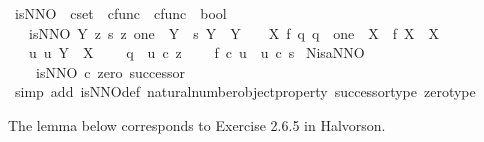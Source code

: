 \begin{isabellebody}
\endisatagproof
{\isafoldproof}%
%
\isadelimproof
\isanewline
%
\endisadelimproof
\isanewline
{}\isamarkupfalse%
\ is{\isacharunderscore}{\kern0pt}NNO\ {\isacharcolon}{\kern0pt}{\isacharcolon}{\kern0pt}\ {\isachardoublequoteopen}cset\ {\isasymRightarrow}\ cfunc\ {\isasymRightarrow}\ cfunc\ {\isasymRightarrow}\ bool{\isachardoublequoteclose}\ \ \isanewline
\ \ \ {\isachardoublequoteopen}is{\isacharunderscore}{\kern0pt}NNO\ Y\ z\ s\ {\isasymlongleftrightarrow}{\isacharparenleft}{\kern0pt}z{\isacharcolon}{\kern0pt}\ one\ {\isasymrightarrow}\ Y\ {\isasymand}\ s{\isacharcolon}{\kern0pt}\ Y\ {\isasymrightarrow}\ Y\ \ {\isasymand}\ {\isacharparenleft}{\kern0pt}{\isasymforall}\ X\ f\ q{\isachardot}{\kern0pt}\ {\isacharparenleft}{\kern0pt}{\isacharparenleft}{\kern0pt}q\ {\isacharcolon}{\kern0pt}\ one\ {\isasymrightarrow}\ X{\isacharparenright}{\kern0pt}\ {\isasymand}\ {\isacharparenleft}{\kern0pt}f{\isacharcolon}{\kern0pt}\ X\ {\isasymrightarrow}\ X{\isacharparenright}{\kern0pt}{\isacharparenright}{\kern0pt}{\isasymlongrightarrow}\isanewline
\ \ \ {\isacharparenleft}{\kern0pt}{\isasymexists}{\isacharbang}{\kern0pt}u{\isachardot}{\kern0pt}\ u{\isacharcolon}{\kern0pt}\ Y\ {\isasymrightarrow}\ X\ {\isasymand}\isanewline
\ \ \ q\ {\isacharequal}{\kern0pt}\ u\ {\isasymcirc}\isactrlsub c\ z\ {\isasymand}\isanewline
\ \ \ f\ {\isasymcirc}\isactrlsub c\ u\ {\isacharequal}{\kern0pt}\ u\ {\isasymcirc}\isactrlsub c\ s{\isacharparenright}{\kern0pt}{\isacharparenright}{\kern0pt}{\isacharparenright}{\kern0pt}{\isachardoublequoteclose}\isanewline
\isanewline
{}\isamarkupfalse%
\ N{\isacharunderscore}{\kern0pt}is{\isacharunderscore}{\kern0pt}a{\isacharunderscore}{\kern0pt}NNO{\isacharcolon}{\kern0pt}\isanewline
\ \ \ \ {\isachardoublequoteopen}is{\isacharunderscore}{\kern0pt}NNO\ {\isasymnat}\isactrlsub c\ zero\ successor{\isachardoublequoteclose}\isanewline
%
\isadelimproof
%
\endisadelimproof
%
\isatagproof
{}\isamarkupfalse%
\ {\isacharparenleft}{\kern0pt}simp\ add{\isacharcolon}{\kern0pt}\ is{\isacharunderscore}{\kern0pt}NNO{\isacharunderscore}{\kern0pt}def\ natural{\isacharunderscore}{\kern0pt}number{\isacharunderscore}{\kern0pt}object{\isacharunderscore}{\kern0pt}property\ successor{\isacharunderscore}{\kern0pt}type\ zero{\isacharunderscore}{\kern0pt}type{\isacharparenright}{\kern0pt}%
\endisatagproof
{\isafoldproof}%
%
\isadelimproof
%
\endisadelimproof
%
\begin{isamarkuptext}%
The lemma below corresponds to Exercise 2.6.5 in Halvorson.%
\end{isamarkuptext}\isamarkuptrue%

\end{isabellebody}
